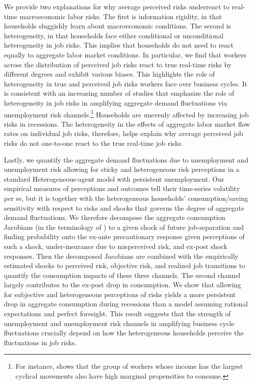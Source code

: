 We provide two explanations for why average perceived risks underreact to real-time macroeconomic labor risks. The first is information rigidity, in that households sluggishly learn about macroeconomic conditions. The second is heterogeneity, in that households face either conditional or unconditional heterogeneity in job risks. This implies that households do not need to react equally to aggregate labor market conditions. In particular, we find that workers across the distribution of perceived job risks react to true real-time risks by different degrees and exhibit various biases. This highlights the role of heterogeneity in true and perceived job risks workers face over business cycles. It is consistent with an increasing number of studies that emphasize the role of heterogeneity in job risks in amplifying aggregate demand fluctuations via unemployment risk channels.\footnote{For instance, \cite{patterson2023matching} shows that the group of workers whose income has the largest cyclical movements also have high marginal propensities to consume. } Households are unevenly affected by increasing job risks in recessions. The heterogeneity in the effects of aggregate labor market flow rates on individual job risks, therefore, helps explain why average perceived job risks do not one-to-one react to the true real-time job risks. 

Lastly, we quantify the aggregate demand fluctuations due to unemployment and unemployment risk allowing for sticky and heterogeneous risk perceptions in a standard Heterogeneous-agent model with persistent unemployment. Our empirical measures of perceptions and outcomes tell their time-series volatility per se, but it is together with the heterogeneous households' consumption/saving sensitivity with respect to risks and shocks that governs the degree of aggregate demand fluctuations. We therefore decompose the aggregate consumption Jacobians (in the terminology of \cite{auclert2021using}) to a given shock of future job-separation and finding probability onto the ex-ante precautionary response given perceptions of such a shock, under-insurance due to misperceived risk, and ex-post shock responses. Then the decomposed Jacobians are combined with the empirically estimated shocks to perceived risk,  objective risk, and realized job transitions to quantify the consumption impacts of these three channels.  The second channel largely contributes to the ex-post drop in consumption. We show that allowing for subjective and heterogeneous perceptions of risks yields a more persistent drop in aggregate consumption during recessions than a model assuming rational expectations and perfect foresight. This result suggests that the strength of unemployment and unemployment risk channels in amplifying business cycle fluctuations crucially depend on how the heterogeneous households perceive the fluctuations in job risks. 



